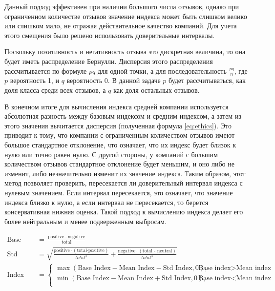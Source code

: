 \documentclass[PI, VKR]{HSEUniversity}
\begin{document}
Данный подход эффективен при наличии большого числа отзывов, однако при ограниченном количестве отзывов значение индекса может быть слишком велико или слишком мало, не отражая действительное качество компаний. Для учета этого смещения было решено использовать доверительные интервалы.

Поскольку позитивность и негативность отзыва это дискретная величина, то она будет иметь распределение Бернулли\autocite{_encyclopaedia_}. Дисперсия этого распределения рассчитывается по формуле \(pq\) для одной точки, а для последовательность \(\frac{pq}{n}\), где \(p\) вероятность 1, и \(q\) вероятность 0. В данной задаче \(p\) будет рассчитываться, как доля класса среди всех отзывов, а \(q\) как доля остальных отзывов.

В конечном итоге для вычисления индекса средней компании используется абсолютная разность между базовым индексом и средним индексом, а затем из этого значения вычитается дисперсия (полученная формула \ref{eq:ethics}). Это приводит к тому, что компании с ограниченным количеством отзывов имеют большое стандартное отклонение, что означает, что их индекс будет близок к нулю или точно равен нулю. С другой стороны, у компаний с большим количеством отзывов стандартное отклонение будет меньшим, и оно либо не изменит, либо незначительно изменит их значение индекса. Таким образом, этот метод позволяет проверить, пересекается ли доверительный интервал индекса с нулевым значением. Если интервал пересекается, это означает, что значение индекса близко к нулю, а если интервал не пересекается, то берется консервативная нижняя оценка. Такой подход к вычислению индекса делает его более нейтральным и менее подверженным выбросам.

\begin{equation}
\label{eq:ethics}
\begin{aligned}
    \text{Base index} &= \frac{\text{positive} - \text{negative}}{\text{total}} \\
    \text{Std index} &= \sqrt{\frac{\text{positive}\cdot(\text{total-positive})}{total^{3}} + \frac{\text{negative}\cdot(\text{total - neutral})}{total^{3}}} \\
    \text{Index} &=
        \begin{cases}
            \max(\text{Base Index}-\text{Mean Index}-\text{Std Index},0), & \text{Base index} > \text{Mean index} \\
            \min(\text{Base Index}-\text{Mean Index}+\text{Std Index},0), & \text{Base index} < \text{Mean index} \\
        \end{cases}
\end{aligned}
\end{equation}
\end{document}
